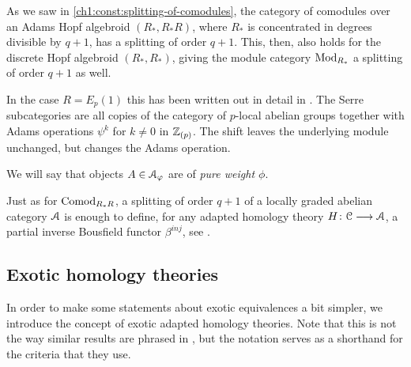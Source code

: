 \begin{example}
    \label{ch1:ex:splitting-modules}
    As we saw in \cref{ch1:const:splitting-of-comodules}, the category of comodules over an Adams Hopf algebroid $(R_*, R_*R)$, where $R_*$ is concentrated in degrees divisible by $q+1$, has a splitting of order $q+1$. This, then, also holds for the discrete Hopf algebroid $(R_*, R_*)$, giving the module category $\mathrm{Mod}_{R_*}$ a splitting of order $q+1$ as well. 
\end{example}

\begin{example}
    In the case $R=E_p(1)$ this has been written out in detail in \cite[Section 4]{barnes-roitzheim_2011}. The Serre subcategories are all copies of the category of $p$-local abelian groups together with Adams operations $\psi^k$ for $k\neq 0$ in $\mathbb{Z}_{(p)}$. The shift leaves the underlying module unchanged, but changes the Adams operation. 
\end{example}
    
\begin{definition}
    \label{ch1:not:pure-weight}
    We will say that objects $A\in \EuScript{A}_\varphi$ are of \emph{pure weight $\phi$}. 
\end{definition}
    
\begin{remark}
    Just as for $\mathrm{Comod}_{R_*R}$, a splitting of order $q+1$ of a locally graded abelian category $\EuScript{A}$ is enough to define, for any adapted homology theory $H\colon \EuScript{C}\longrightarrow \EuScript{A}$, a partial inverse Bousfield functor $\beta^{inj}$, see \cite[Section 7.2]{patchkoria-pstragowski_2021}. 
\end{remark}








\subsection{Exotic homology theories}


In order to make some statements about exotic equivalences a bit simpler, we introduce the concept of exotic adapted homology theories. Note that this is not the way similar results are phrased in \cite{patchkoria-pstragowski_2021}, but the notation serves as a shorthand for the criteria that they use. 

